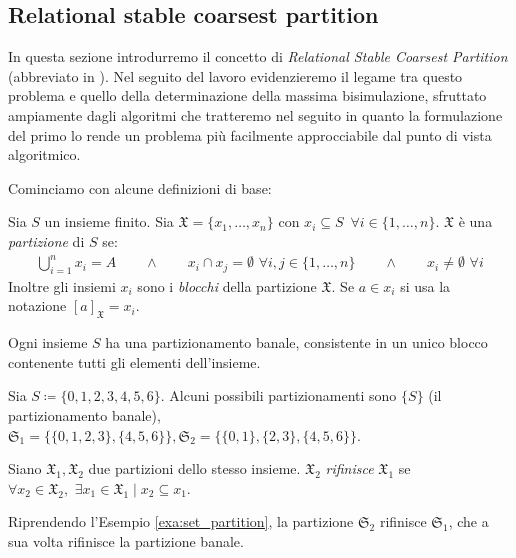 \subsection{Relational stable coarsest partition}
\label{sec:rscp}
In questa sezione introdurremo il concetto di \emph{Relational Stable Coarsest Partition} (abbreviato in \rscp). Nel seguito del lavoro evidenzieremo il legame tra questo problema e quello della determinazione della massima bisimulazione, sfruttato ampiamente dagli algoritmi che tratteremo nel seguito in quanto la formulazione del primo lo rende un problema più facilmente approcciabile dal punto di vista algoritmico.

Cominciamo con alcune definizioni di base:
\begin{definition}
    Sia $S$ un insieme finito. Sia $\mathfrak{X} = \{x_1, \dots, x_n\}$ con $x_i \subseteq S \,\,\,\forall i \in \{1,\dots,n\}$. $\mathfrak{X}$ è una \emph{partizione} di $S$ se:
    \begin{gather*}
        \bigcup_{i = 1}^n x_i = A \qquad \land \qquad x_i \cap x_j = \emptyset \,\,\forall i,j \in \{1,\dots,n\} \qquad \land \qquad x_i \neq \emptyset \,\,\forall i
    \end{gather*}
    Inoltre gli insiemi $x_i$ sono i \emph{blocchi} della partizione $\mathfrak{X}$. Se $a \in x_i$ si usa la notazione $[a]_{\mathfrak{X}} = x_i$.
\end{definition}

\begin{observation}
    \label{obs:part_banale}
    Ogni insieme $S$ ha una partizionamento banale, consistente in un unico blocco contenente tutti gli elementi dell'insieme.
\end{observation}

\begin{example}
    Sia $S \coloneqq \{0,1,2,3,4,5,6\}$. Alcuni possibili partizionamenti sono $\{S\}$ (il partizionamento banale), $\mathfrak{S}_1 = \{\{0,1,2,3\},\{4,5,6\}\}, \mathfrak{S}_2 = \{\{0,1\},\{2,3\},\{4,5,6\}\}$.
    \label{exa:set_partition}
\end{example}

\begin{definition}
    Siano $\mathfrak{X}_1,\mathfrak{X}_2$ due partizioni dello stesso insieme. $\mathfrak{X}_2$ \emph{rifinisce} $\mathfrak{X}_1$ se $\forall x_2 \in \mathfrak{X}_2, \,\,\exists x_1 \in \mathfrak{X}_1 \mid x_2 \subseteq x_1$.
\end{definition}

\begin{example}
    Riprendendo l'Esempio \ref*{exa:set_partition}, la partizione $\mathfrak{S}_2$ rifinisce $\mathfrak{S}_1$, che a sua volta rifinisce la partizione banale.
\end{example}

